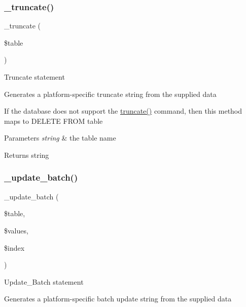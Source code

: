 \subsubsection{\texorpdfstring{\+\_\+truncate()}{\_truncate()}}
{\footnotesize\ttfamily \+\_\+truncate (\begin{DoxyParamCaption}\item[{}]{\$table }\end{DoxyParamCaption})\hspace{0.3cm}{\ttfamily [protected]}}

Truncate statement

Generates a platform-\/specific truncate string from the supplied data

If the database does not support the \mbox{\hyperlink{class_c_i___d_b__query__builder_acaa636a6a61d4362c5a32941fc9932ba}{truncate()}} command, then this method maps to \textquotesingle{}D\+E\+L\+E\+TE F\+R\+OM table\textquotesingle{}


\begin{DoxyParams}{Parameters}
{\em string} & the table name \\
\hline
\end{DoxyParams}
\begin{DoxyReturn}{Returns}
string 
\end{DoxyReturn}
\mbox{\label{class_c_i___d_b__query__builder_a336b9ebb119e47b6a84bb7fc9d4dae93}} 
\subsubsection{\texorpdfstring{\+\_\+update\+\_\+batch()}{\_update\_batch()}}
{\footnotesize\ttfamily \+\_\+update\+\_\+batch (\begin{DoxyParamCaption}\item[{}]{\$table,  }\item[{}]{\$values,  }\item[{}]{\$index }\end{DoxyParamCaption})\hspace{0.3cm}{\ttfamily [protected]}}

Update\+\_\+\+Batch statement

Generates a platform-\/specific batch update string from the supplied data


